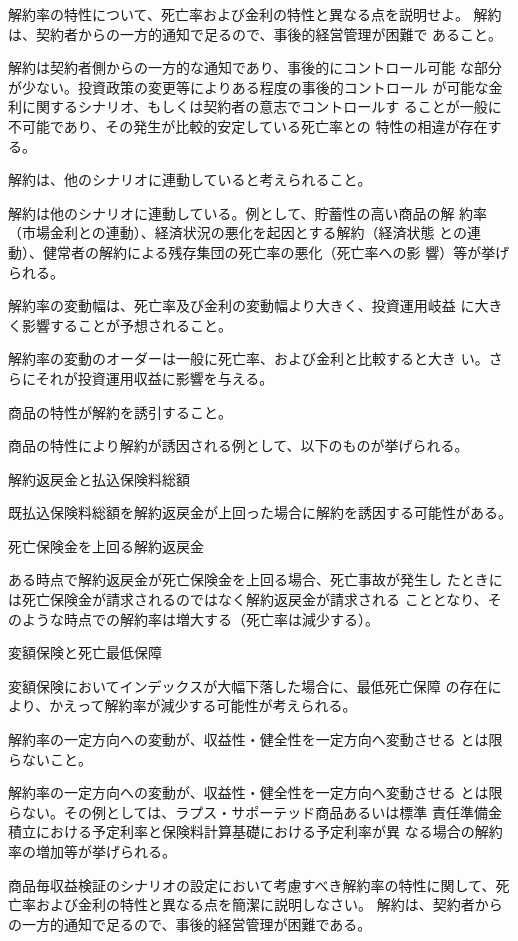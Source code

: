 \documentclass[report,gutter=10mm,fore-edge=10mm,uplatex,dvipdfmx]{jlreq}
\begin{document}
解約率の特性について、死亡率および金利の特性と異なる点を説明せよ。
\answer{}
解約は、契約者からの一方的通知で足るので、事後的経営管理が困難で
あること。

解約は契約者側からの一方的な通知であり、事後的にコントロール可能
な部分が少ない。投資政策の変更等によりある程度の事後的コントロール
が可能な金利に関するシナリオ、もしくは契約者の意志でコントロールす
ることが一般に不可能であり、その発生が比較的安定している死亡率との
特性の相違が存在する。

解約は、他のシナリオに連動していると考えられること。

解約は他のシナリオに連動している。例として、貯蓄性の高い商品の解
約率（市場金利との連動）、経済状況の悪化を起因とする解約（経済状態
との連動）、健常者の解約による残存集団の死亡率の悪化（死亡率への影
響）等が挙げられる。

解約率の変動幅は、死亡率及び金利の変動幅より大きく、投資運用岐益
に大きく影響することが予想されること。

解約率の変動のオーダーは一般に死亡率、および金利と比較すると大き
い。さらにそれが投資運用収益に影響を与える。

商品の特性が解約を誘引すること。

商品の特性により解約が誘因される例として、以下のものが挙げられる。

解約返戻金と払込保険料総額

既払込保険料総額を解約返戻金が上回った場合に解約を誘因する可能性がある。

死亡保険金を上回る解約返戻金

ある時点で解約返戻金が死亡保険金を上回る場合、死亡事故が発生し
たときには死亡保険金が請求されるのではなく解約返戻金が請求される
こととなり、そのような時点での解約率は増大する（死亡率は減少する）。

変額保険と死亡最低保障

変額保険においてインデックスが大幅下落した場合に、最低死亡保障
の存在により、かえって解約率が減少する可能性が考えられる。


解約率の一定方向への変動が、収益性・健全性を一定方向へ変動させる
とは限らないこと。

解約率の一定方向への変動が、収益性・健全性を一定方向へ変動させる
とは限らない。その例としては、ラプス・サポーテッド商品あるいは標準
責任準備金積立における予定利率と保険料計算基礎における予定利率が異
なる場合の解約率の増加等が挙げられる。

商品毎収益検証のシナリオの設定において考慮すべき解約率の特性に関して、死亡率および金利の特性と異なる点を簡潔に説明しなさい。
\answer{}
解約は、契約者からの一方的通知で足るので、事後的経営管理が困難である。
\end{document}
